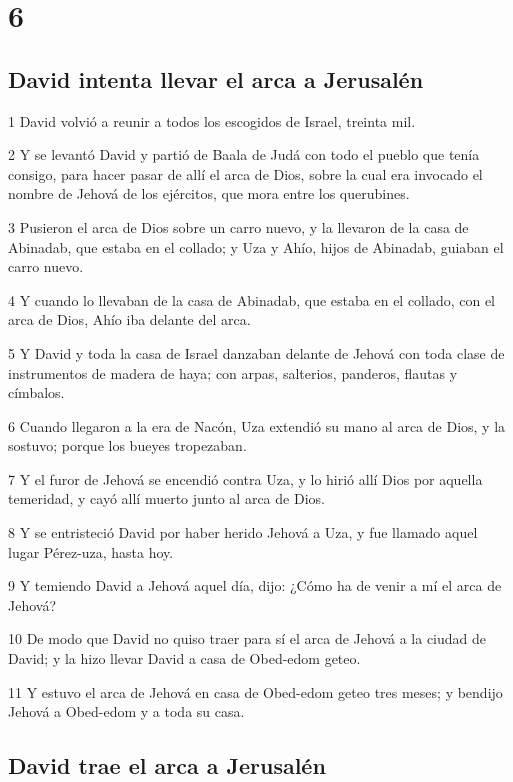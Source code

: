 \chapter{6}

\section*{David intenta llevar el arca a Jerusalén}

\par 1 David volvió a reunir a todos los escogidos de Israel, treinta mil.
\par 2 Y se levantó David y partió de Baala de Judá con todo el pueblo que tenía consigo, para hacer pasar de allí el arca de Dios, sobre la cual era invocado el nombre de Jehová de los ejércitos, que mora entre los querubines. 
\par 3 Pusieron el arca de Dios sobre un carro nuevo, y la llevaron de la casa de Abinadab, que estaba en el collado; y Uza y Ahío, hijos de Abinadab, guiaban el carro nuevo.
\par 4 Y cuando lo llevaban de la casa de Abinadab, que estaba en el collado, con el arca de Dios, Ahío iba delante del arca.
\par 5 Y David y toda la casa de Israel danzaban delante de Jehová con toda clase de instrumentos de madera de haya; con arpas, salterios, panderos, flautas y címbalos.
\par 6 Cuando llegaron a la era de Nacón, Uza extendió su mano al arca de Dios, y la sostuvo; porque los bueyes tropezaban.
\par 7 Y el furor de Jehová se encendió contra Uza, y lo hirió allí Dios por aquella temeridad, y cayó allí muerto junto al arca de Dios.
\par 8 Y se entristeció David por haber herido Jehová a Uza, y fue llamado aquel lugar Pérez-uza, hasta hoy.
\par 9 Y temiendo David a Jehová aquel día, dijo: ¿Cómo ha de venir a mí el arca de Jehová?
\par 10 De modo que David no quiso traer para sí el arca de Jehová a la ciudad de David; y la hizo llevar David a casa de Obed-edom geteo.
\par 11 Y estuvo el arca de Jehová en casa de Obed-edom geteo tres meses; y bendijo Jehová a Obed-edom y a toda su casa. 

\section*{David trae el arca a Jerusalén}

